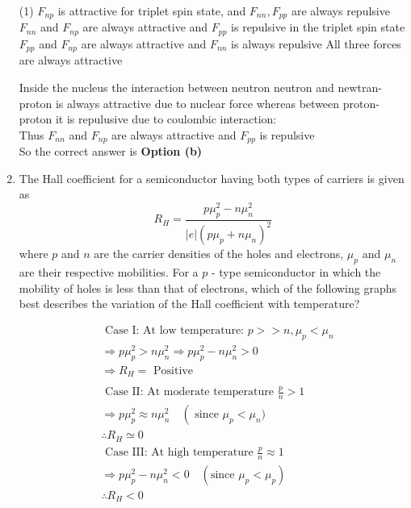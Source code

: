 \begin{enumerate}
 \begin{tasks}(1)
	\task[\textbf{a.}]$F_{n p}$ is attractive for triplet spin state, and $F_{n n}, F_{p p}$ are always repulsive
	\task[\textbf{b.}]$F_{n n}$ and $F_{n p}$ are always attractive and $F_{p p}$ is repulsive in the triplet spin state
	\task[\textbf{c.}] $F_{p p}$ and $F_{n p}$ are always attractive and $F_{n n}$ is always repulsive
	\task[\textbf{d.}] All three forces are always attractive
\end{tasks}
\begin{answer}
	Inside the nucleus the interaction between neutron neutron and newtran-proton is always attractive due to nuclear force whereas between proton-proton it is repulusive due to coulombic interaction:\\
	Thus $F_{n n}$ and $F_{n p}$ are always attractive and $F_{p p}$ is repulsive\\
	So the correct answer is \textbf{Option (b)}
\end{answer}
\item The Hall coefficient for a semiconductor having both types of carriers is given as
$$
R_{H}=\frac{p \mu_{p}^{2}-n \mu_{n}^{2}}{|e|\left(p \mu_{p}+n \mu_{n}\right)^{2}}
$$
where $p$ and $n$ are the carrier densities of the holes and electrons, $\mu_{p}$ and $\mu_{n}$ are their respective mobilities. For a $p$ - type semiconductor in which the mobility of holes is less than that of electrons, which of the following graphs best describes the variation of the Hall coefficient with temperature?	
\begin{answer}
	\begin{align*}
	&\text { Case I: At low temperature: } p>>n, \mu_{p}<\mu_{n}\\
	&\Rightarrow p \mu_{p}^{2}>n \mu_{n}^{2} \Rightarrow p \mu_{p}^{2}-n \mu_{n}^{2}>0 \\
	&\Rightarrow R_{H}=\text { Positive }\\\\
	&\text { Case II: At moderate temperature } \frac{p}{n}>1\\
	&\Rightarrow p \mu_{p}^{2} \approx n \mu_{n}^{2} \quad\left(\right.\text{ since }\mu_{p}<\mu_{n} )\\
	&\therefore R_{H} \simeq 0\\
	&\text { Case III: At high temperature } \frac{p}{n} \approx 1\\
	&\Rightarrow p \mu_{p}^{2}-n \mu_{n}^{2}<0 \quad\left(\right. \text{since }\left.\mu_{p}<\mu_{p}\right)\\
	&\therefore R_{H}<0

\end{align*}
\end{answer}
\end{enumerate}
